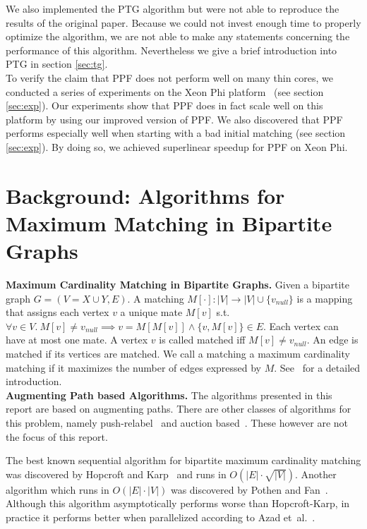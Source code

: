 \documentclass[letterpaper]{article}
\newcommand{\mypar}[1]{{\bf #1.}}
\begin{document}
We also implemented the PTG algorithm but were not able to reproduce the results of the original paper. 
Because we could not invest enough time to properly optimize the algorithm, we are not able to make any statements concerning the performance of this algorithm.
Nevertheless we give a brief introduction into PTG in section \ref{sec:tg}.\\

To verify the claim that PPF does not perform well on many thin cores, we conducted a series of experiments on the Xeon Phi platform~\cite{XeonPhi} (see section \ref{sec:exp}). 
Our experiments show that PPF does in fact scale well on this platform by using our improved version of PPF. We also discovered that PPF
performs especially well when starting with a bad initial matching (see section \ref{sec:exp}). 
By doing so, we achieved superlinear speedup for PPF on Xeon Phi.

\section{Background: Algorithms for Maximum Matching in Bipartite Graphs}\label{sec:background}

\mypar{Maximum Cardinality Matching in Bipartite Graphs}
Given a bipartite graph $G = (V = X \cup Y, E)$.
A matching $M[\cdot]: |V| \rightarrow |V| \cup \{v_{null}\}$ is a mapping that assigns each vertex $v$ a unique mate $M[v]$ s.t. 
$\forall v \in V.\ M[v] \neq v_{null} \implies v = M[M[v]] \wedge \{v, M[v]\} \in E$.
Each vertex can have at most one mate. A vertex $v$ is called matched iff $M[v] \neq v_{null}$. An edge is matched if its vertices are matched. 
We call a matching a maximum cardinality matching if it maximizes the number of edges expressed by $M$. See~\cite{intro_alg} for a detailed introduction.\\

\mypar{Augmenting Path based Algorithms}
The algorithms presented in this report are based on augmenting paths. 
There are other classes of algorithms for this problem, namely push-relabel~\cite{GoldbergT88} and auction based~\cite{Bertsekas}. 
These however are not the focus of this report. 

The best known sequential algorithm for bipartite maximum cardinality matching was discovered by Hopcroft and Karp~\cite{HK:1973}
and runs in $O(|E|\cdot \sqrt{|V|})$. Another algorithm which runs in $O(|E|\cdot|V|)$ was discovered by Pothen and Fan~\cite{Pothen:1990}.
Although this algorithm asymptotically performs worse than Hopcroft-Karp, in practice it performs better when parallelized according to Azad et\ al.~\cite{Azad:2012}.
\end{document}
